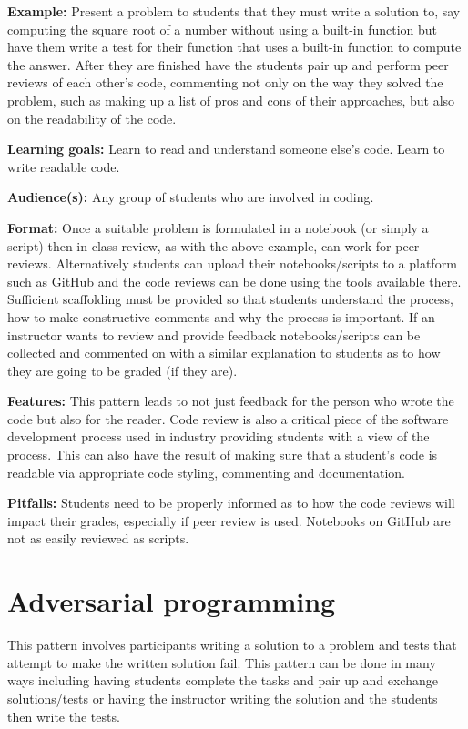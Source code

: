 \documentclass[]{book}
\begin{document}
\textbf{Example:} Present a problem to students that they must write a
solution to, say computing the square root of a number without using a
built-in function but have them write a test for their function that
uses a built-in function to compute the answer. After they are finished
have the students pair up and perform peer reviews of each other's code,
commenting not only on the way they solved the problem, such as making
up a list of pros and cons of their approaches, but also on the
readability of the code.

\textbf{Learning goals:} Learn to read and understand someone else's
code. Learn to write readable code.

\textbf{Audience(s):} Any group of students who are involved in coding.

\textbf{Format:} Once a suitable problem is formulated in a notebook (or
simply a script) then in-class review, as with the above example, can
work for peer reviews. Alternatively students can upload their
notebooks/scripts to a platform such as GitHub and the code reviews can
be done using the tools available there. Sufficient scaffolding must be
provided so that students understand the process, how to make
constructive comments and why the process is important. If an instructor
wants to review and provide feedback notebooks/scripts can be collected
and commented on with a similar explanation to students as to how they
are going to be graded (if they are).

\textbf{Features:} This pattern leads to not just feedback for the
person who wrote the code but also for the reader. Code review is also a
critical piece of the software development process used in industry
providing students with a view of the process. This can also have the
result of making sure that a student's code is readable via appropriate
code styling, commenting and documentation.

\textbf{Pitfalls:} Students need to be properly informed as to how the
code reviews will impact their grades, especially if peer review is
used. Notebooks on GitHub are not as easily reviewed as scripts.

\section{Adversarial programming}\label{adversarial-programming}

This pattern involves participants writing a solution to a problem and
tests that attempt to make the written solution fail. This pattern can
be done in many ways including having students complete the tasks and
pair up and exchange solutions/tests or having the instructor writing
the solution and the students then write the tests.
\end{document}

